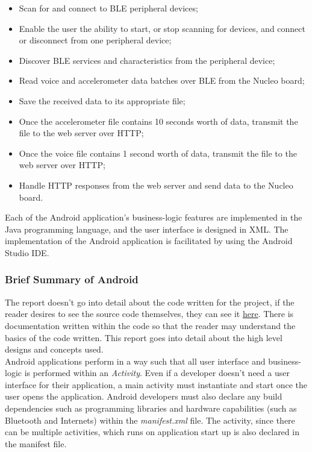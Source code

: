 \begin{itemize}
    \item Scan for and connect to BLE peripheral devices;
    \item Enable the user the ability to start, or stop scanning for devices, and connect or disconnect from one peripheral device;
    \item Discover BLE services and characteristics from the peripheral device;
    \item Read voice and accelerometer data batches over BLE from the Nucleo board;
    \item Save the received data to its appropriate file;
    \item Once the accelerometer file contains 10 seconds worth of data, transmit the file to the web server over HTTP;
    \item Once the voice file contains 1 second worth of data, transmit the file to the web server over HTTP;
    \item Handle HTTP responses from the web server and send data to the Nucleo board.
\end{itemize}

Each of the Android application's business-logic features are implemented in the Java programming language, and the user interface is designed in XML. The implementation of the Android application is facilitated by using the Android Studio IDE.\\

\subsubsection{Brief Summary of Android}

The report doesn't go into detail about the code written for the project, if the reader desires to see the source code themselves, they can see it \href{https://github.com/lebrice/MicroP/tree/master/project}{here}. There is documentation written within the code so that the reader may understand the basics of the code written. This report goes into detail about the high level designs and concepts used.\\

Android applications perform in a way such that all user interface and business-logic is performed within an \textit{Activity}. Even if a developer doesn't need a user interface for their application, a main activity must instantiate and start once the user opens the application. Android developers must also declare any build dependencies such as programming libraries and hardware capabilities (such as Bluetooth and Internets) within the \textit{manifest.xml} file. The activity, since there can be multiple activities, which runs on application start up is also declared in the manifest file.\\

